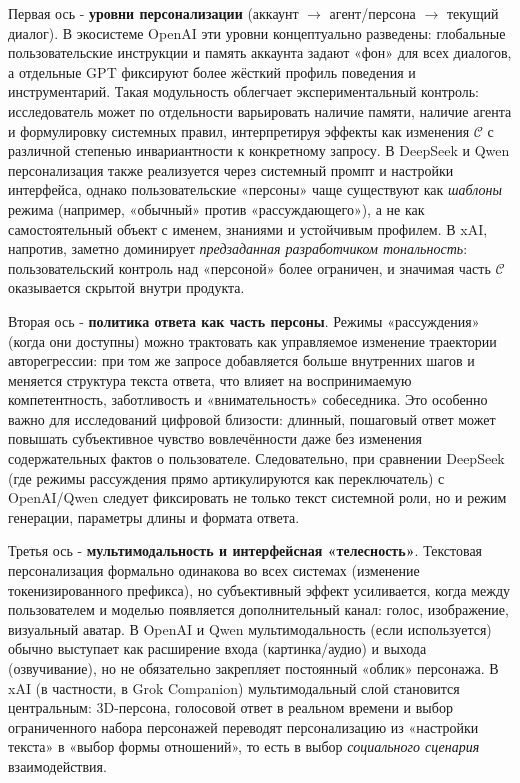 \documentclass[areasetadvanced]{scrartcl}
\begin{document}
  Первая ось - \textbf{уровни персонализации} (аккаунт $\rightarrow$ агент/персона $\rightarrow$ текущий диалог). В экосистеме OpenAI эти уровни концептуально разведены: глобальные пользовательские инструкции и память аккаунта задают «фон» для всех диалогов, а отдельные GPT фиксируют более жёсткий профиль поведения и инструментарий. Такая модульность облегчает экспериментальный контроль: исследователь может по отдельности варьировать наличие памяти, наличие агента и формулировку системных правил, интерпретируя эффекты как изменения $\mathcal{C}$ с различной степенью инвариантности к конкретному запросу. В DeepSeek и Qwen персонализация также реализуется через системный промпт и настройки интерфейса, однако пользовательские «персоны» чаще существуют как \emph{шаблоны} режима (например, «обычный» против «рассуждающего»), а не как самостоятельный объект с именем, знаниями и устойчивым профилем. В xAI, напротив, заметно доминирует \emph{предзаданная разработчиком тональность}: пользовательский контроль над «персоной» более ограничен, и значимая часть $\mathcal{C}$ оказывается скрытой внутри продукта.
  
  Вторая ось - \textbf{политика ответа как часть персоны}. Режимы «рассуждения» (когда они доступны) можно трактовать как управляемое изменение траектории авторегрессии: при том же запросе добавляется больше внутренних шагов и меняется структура текста ответа, что влияет на воспринимаемую компетентность, заботливость и «внимательность» собеседника. Это особенно важно для исследований цифровой близости: длинный, пошаговый ответ может повышать субъективное чувство вовлечённости даже без изменения содержательных фактов о пользователе. Следовательно, при сравнении DeepSeek (где режимы рассуждения прямо артикулируются как переключатель) с OpenAI/Qwen следует фиксировать не только текст системной роли, но и режим генерации, параметры длины и формата ответа.
  
  Третья ось - \textbf{мультимодальность и интерфейсная «телесность»}. Текстовая персонализация формально одинакова во всех системах (изменение токенизированного префикса), но субъективный эффект усиливается, когда между пользователем и моделью появляется дополнительный канал: голос, изображение, визуальный аватар. В OpenAI и Qwen мультимодальность (если используется) обычно выступает как расширение входа (картинка/аудио) и выхода (озвучивание), но не обязательно закрепляет постоянный «облик» персонажа. В xAI (в частности, в Grok Companion) мультимодальный слой становится центральным: 3D-персона, голосовой ответ в реальном времени и выбор ограниченного набора персонажей переводят персонализацию из «настройки текста» в «выбор формы отношений», то есть в выбор \emph{социального сценария} взаимодействия.
  
\end{document}
